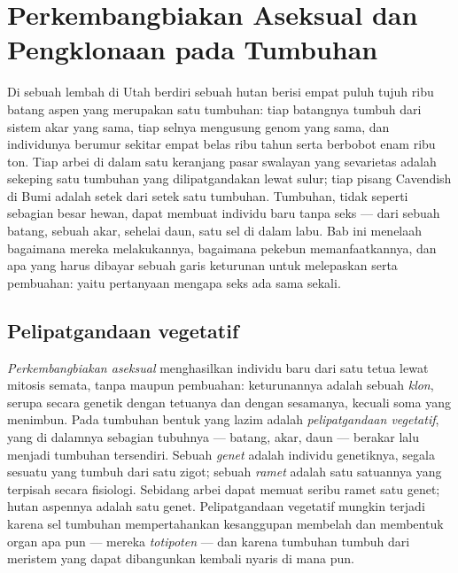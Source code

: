 \chapter{Perkembangbiakan Aseksual dan Pengklonaan pada Tumbuhan}\label{ch:b2:asexual-reproduction}

Di sebuah lembah di Utah berdiri sebuah hutan berisi empat puluh tujuh
ribu batang aspen yang merupakan satu tumbuhan: tiap batangnya tumbuh
dari sistem akar yang sama, tiap selnya mengusung genom yang sama, dan
individunya berumur sekitar empat belas ribu tahun serta berbobot enam
ribu ton. Tiap arbei di dalam satu keranjang pasar swalayan yang
sevarietas adalah sekeping satu tumbuhan yang dilipatgandakan lewat
sulur; tiap pisang Cavendish di Bumi adalah setek dari setek satu
tumbuhan. Tumbuhan, tidak seperti sebagian besar hewan, dapat membuat
individu baru tanpa seks --- dari sebuah batang, sebuah akar, sehelai
daun, satu sel di dalam labu. Bab ini menelaah bagaimana mereka
melakukannya, bagaimana pekebun memanfaatkannya, dan apa yang harus
dibayar sebuah garis keturunan untuk melepaskan  serta
pembuahan: yaitu pertanyaan mengapa seks ada sama sekali.

\section{Pelipatgandaan vegetatif}

\begin{definition}\label{def:b2:asexual-reproduction:clone}
\emph{Perkembangbiakan aseksual} menghasilkan individu baru dari satu
tetua lewat mitosis semata, tanpa  maupun pembuahan:
keturunannya adalah sebuah \emph{klon}, serupa secara genetik dengan
tetuanya dan dengan sesamanya, kecuali  soma yang menimbun. Pada
tumbuhan bentuk yang lazim adalah \emph{pelipatgandaan vegetatif}, yang
di dalamnya sebagian tubuhnya --- batang, akar, daun --- berakar lalu
menjadi tumbuhan tersendiri. Sebuah \emph{genet} adalah individu
genetiknya, segala sesuatu yang tumbuh dari satu zigot; sebuah
\emph{ramet} adalah satu satuannya yang terpisah secara fisiologi.
Sebidang arbei dapat memuat seribu ramet satu genet; hutan aspennya
adalah satu genet. Pelipatgandaan vegetatif mungkin terjadi karena sel
tumbuhan mempertahankan kesanggupan membelah dan membentuk organ apa
pun --- mereka \emph{totipoten} --- dan karena tumbuhan tumbuh dari
meristem yang dapat dibangunkan kembali nyaris di mana pun.
\end{definition}


